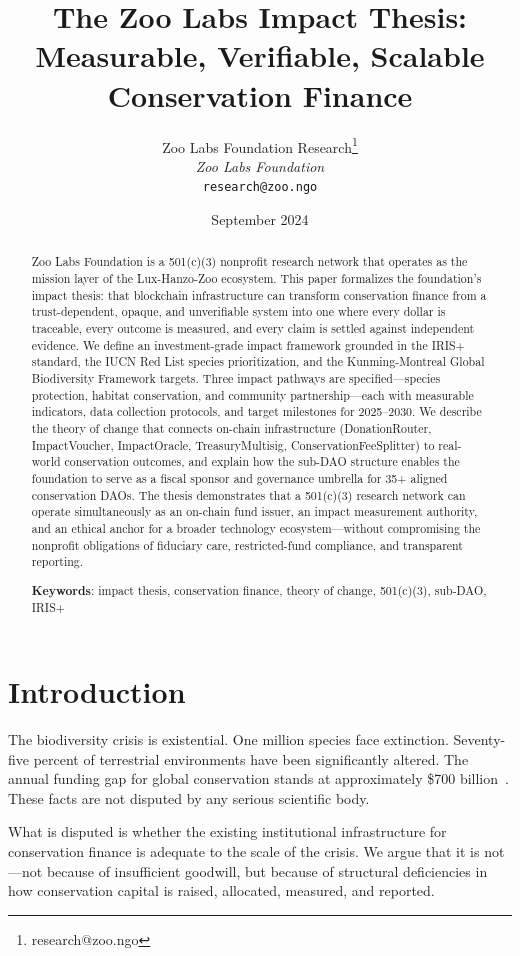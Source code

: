 \documentclass[11pt,letterpaper]{article}
\title{\textbf{The Zoo Labs Impact Thesis: Measurable, Verifiable, Scalable Conservation Finance}}
\author{
Zoo Labs Foundation Research\thanks{research@zoo.ngo}\\
\textit{Zoo Labs Foundation}\\
\texttt{research@zoo.ngo}
}
\date{September 2024}
\begin{document}
\zoocoverpage

\begin{abstract}
Zoo Labs Foundation is a 501(c)(3) nonprofit research network that operates as the mission layer of the Lux-Hanzo-Zoo ecosystem. This paper formalizes the foundation's impact thesis: that blockchain infrastructure can transform conservation finance from a trust-dependent, opaque, and unverifiable system into one where every dollar is traceable, every outcome is measured, and every claim is settled against independent evidence. We define an investment-grade impact framework grounded in the IRIS+ standard, the IUCN Red List species prioritization, and the Kunming-Montreal Global Biodiversity Framework targets. Three impact pathways are specified---species protection, habitat conservation, and community partnership---each with measurable indicators, data collection protocols, and target milestones for 2025--2030. We describe the theory of change that connects on-chain infrastructure (DonationRouter, ImpactVoucher, ImpactOracle, TreasuryMultisig, ConservationFeeSplitter) to real-world conservation outcomes, and explain how the sub-DAO structure enables the foundation to serve as a fiscal sponsor and governance umbrella for 35+ aligned conservation DAOs. The thesis demonstrates that a 501(c)(3) research network can operate simultaneously as an on-chain fund issuer, an impact measurement authority, and an ethical anchor for a broader technology ecosystem---without compromising the nonprofit obligations of fiduciary care, restricted-fund compliance, and transparent reporting.

\textbf{Keywords}: impact thesis, conservation finance, theory of change, 501(c)(3), sub-DAO, IRIS+
\end{abstract}

\section{Introduction}

The biodiversity crisis is existential. One million species face extinction. Seventy-five percent of terrestrial environments have been significantly altered. The annual funding gap for global conservation stands at approximately \$700 billion~\cite{paulson2020}. These facts are not disputed by any serious scientific body.

What is disputed is whether the existing institutional infrastructure for conservation finance is adequate to the scale of the crisis. We argue that it is not---not because of insufficient goodwill, but because of structural deficiencies in how conservation capital is raised, allocated, measured, and reported.
\end{document}
